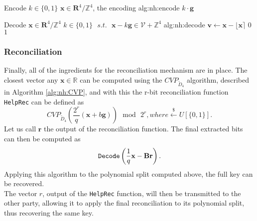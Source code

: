 \begin{b_algorithm}{Encode}
{$k \in \{0,1\}$}
{$\textbf{x} \in \mathbf{R}^4/\mathbb{Z}^4$, the encoding}
{alg:nh:encode}
\RETURN $k\cdot\textbf{g}$
\end{b_algorithm}

\begin{b_algorithm}{Decode}
{$\textbf{x} \in \mathbf{R}^4/\mathbb{Z}^4$}
{$k \in \{0,1\}\text{ }s.t.\text{ }\textbf{x} - k\textbf{g} \in \mathscr{V}+\mathbb{Z}^4$}
{alg:nh:decode}
\STATE $\textbf{v} \gets \mathbf{x} - \lfloor\mathbf{x}\rceil$
    \RETURN $0$
\ELSE
    \RETURN $1$
\ENDIF
\end{b_algorithm}

\subsubsection{Reconciliation}
Finally, all of the ingredients for the reconciliation mechanism are in place. The closest vector any $\mathbf{x}\in\mathbb{R}$ can be computed using the $CVP_{\tilde{D}_4}$ algorithm, described in Algorithm \ref{alg:nh:CVP}, and with this the r-bit reconciliation function \verb|HelpRec| can be defined as 
\begin{equation}
CVP_{\tilde{D}_4}\left(\frac{2^r}{q}(\mathbf{x}+b\mathbf{g})\right)\text{ }\mathrm{mod}\text{ }2^r, where \xleftarrow{\$}U[\{0,1\}].
\end{equation}
Let us call $\mathbf{r}$ the output of the reconciliation function. The final extracted bits can then be computed as 
\begin{equation}
\verb|Decode|\left(\frac{1}{q}\mathbf{x}-\mathbf{Br}\right).
\end{equation}
Applying this algorithm to the polynomial split computed above, the full key can be recovered.\\
The vector $r$, output of the \verb|HelpRec| function, will then be transmitted to the other party, allowing it to apply the final reconciliation to its polynomial split, thus recovering the same key.


